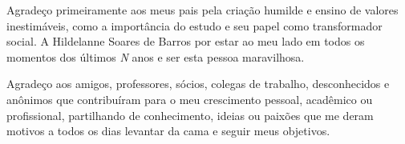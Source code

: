 \begin{agradecimentos}
	Agradeço primeiramente aos meus pais pela criação humilde e ensino de valores inestimáveis, como a importância do estudo e seu papel como transformador social. A Hildelanne Soares de Barros por estar ao meu lado em todos os momentos dos últimos \emph{N} anos e ser esta pessoa maravilhosa.
    
    Agradeço aos amigos, professores, sócios, colegas de trabalho, desconhecidos e anônimos que contribuíram para o meu crescimento pessoal, acadêmico ou profissional, partilhando de conhecimento, ideias ou paixões que me deram motivos a todos os dias levantar da cama e seguir meus objetivos.
    
\end{agradecimentos}